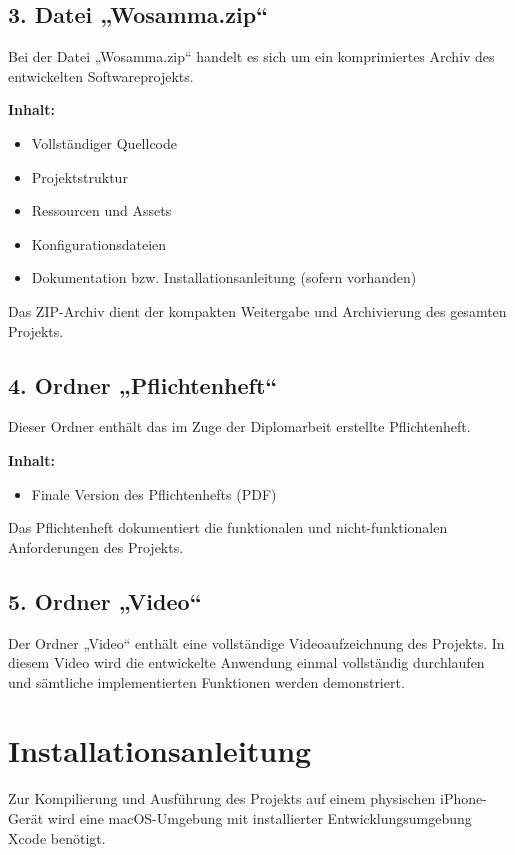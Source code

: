 \subsection*{3. Datei „Wosamma.zip“}
 
Bei der Datei „Wosamma.zip“ handelt es sich um ein komprimiertes Archiv des entwickelten Softwareprojekts.
 
\textbf{Inhalt:}
\begin{itemize}
    \item Vollständiger Quellcode
    \item Projektstruktur
    \item Ressourcen und Assets
    \item Konfigurationsdateien
    \item Dokumentation bzw. Installationsanleitung (sofern vorhanden)
\end{itemize}
 
Das ZIP-Archiv dient der kompakten Weitergabe und Archivierung des gesamten Projekts.
 
\subsection*{4. Ordner „Pflichtenheft“}
 
Dieser Ordner enthält das im Zuge der Diplomarbeit erstellte Pflichtenheft.
 
\textbf{Inhalt:}
\begin{itemize}
    \item Finale Version des Pflichtenhefts (PDF)
\end{itemize}
 
Das Pflichtenheft dokumentiert die funktionalen und nicht-funktionalen Anforderungen des Projekts.
 
\subsection*{5. Ordner „Video“}
 
Der Ordner „Video“ enthält eine vollständige Videoaufzeichnung des Projekts.  
In diesem Video wird die entwickelte Anwendung einmal vollständig durchlaufen und sämtliche implementierten Funktionen werden demonstriert.
 
\section{Installationsanleitung}
 
Zur Kompilierung und Ausführung des Projekts auf einem physischen iPhone-Gerät wird eine macOS-Umgebung mit installierter Entwicklungsumgebung Xcode benötigt.
 
